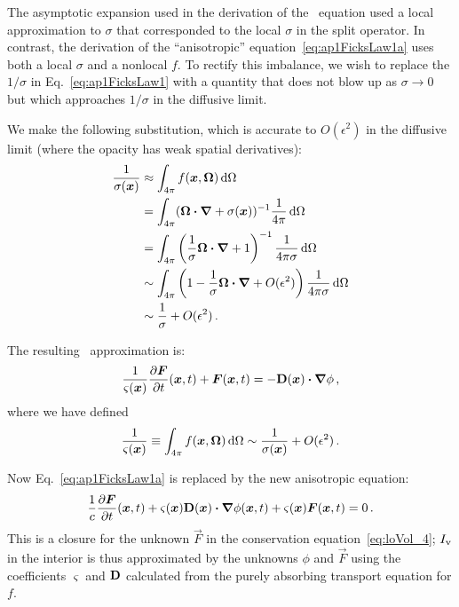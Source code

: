 The asymptotic expansion used in the derivation of the \Pone\ equation used a
local approximation to $\sigma$ that corresponded to the local $\sigma$ in the
split operator.
In contrast, the derivation of the ``anisotropic''
equation~\eqref{eq:ap1FicksLaw1a} uses both a local $\sigma$ and a nonlocal $f$.
To rectify this imbalance, we wish to replace the $1/\sigma$ in
Eq.~\eqref{eq:ap1FicksLaw1} with a quantity 
that does not blow up as $\sigma\to 0$ but which approaches $1/\sigma$ in the
diffusive limit.

We make the following substitution, which is accurate to $O(\epsilon^2)$ in the
diffusive limit (where the opacity has weak spatial derivatives):
\begin{align*}
  \frac{1}{\sigma(\bm{x})}
  &\approx \int_{4\pi} f(\bm{x},\bm{\Omega}) \mathop{}\!\mathrm{d} \Omega
  \\
  &= \int_{4\pi} (\bm{\Omega} \bm{\cdot} \bm{\nabla} + \sigma(\bm{x}) )^{-1}
  \frac{1}{4\pi} \mathop{}\!\mathrm{d} \Omega
  \\
  &= \int_{4\pi} \left( \frac{1}{\sigma} \bm{\Omega} \bm{\cdot}
  \bm{\nabla} + 1 \right)^{-1} \frac{1}{4\pi\sigma} \mathop{}\!\mathrm{d} \Omega
  \\
  &\sim \int_{4\pi} \left(1 - \frac{1}{\sigma} \bm{\Omega} \bm{\cdot}
  \bm{\nabla} + O(\epsilon^2) \right) \frac{1}{4\pi\sigma} \mathop{}\!\mathrm{d} \Omega
  \\
  &\sim \frac{1}{\sigma} + O(\epsilon^2) \,.
\end{align*}

The resulting \APone\ approximation is:
\begin{equation*}
  \frac{1}{\varsigma(\bm{x})} \frac{\partial \bm{F}}{\partial t}(\bm{x},t)
  + \bm{F}(\bm{x},t) = - \mathbf{D}(\bm{x}) \bm{\cdot} \bm{\nabla} \phi \,,
\end{equation*}
where we have defined
\begin{equation}\label{eq:varSigma}
  \frac{1}{\varsigma(\bm{x})}
  \equiv \int_{4\pi} f(\bm{x},\bm{\Omega}) \mathop{}\!\mathrm{d} \Omega
  \sim \frac{1}{\sigma(\bm{x})} + O(\epsilon^2)\,.
\end{equation}

Now Eq.~\eqref{eq:ap1FicksLaw1a} is replaced by the new anisotropic \Pone
equation:
\begin{equation}\label{eq:ap1FicksLawFinal}
  \frac{1}{c}\frac{\partial \bm{F}}{\partial t}(\bm{x},t)
  + \varsigma(\bm{x}) \mathbf{D}(\bm{x}) \bm{\cdot} \bm{\nabla} \phi(\bm{x}, t)
  + \varsigma(\bm{x})\bm{F}(\bm{x},t) 
  = 0 \,.
\end{equation}
This is a closure for the unknown $\vec{F}$ in the conservation
equation~\eqref{eq:loVol_4}; $I_\mathrm{v}$ in the interior is thus approximated by
the unknowns $\phi$ and $\vec{F}$ using the coefficients $\varsigma$ and
$\mathbf{D}$ calculated from the purely absorbing transport equation for $f$.

